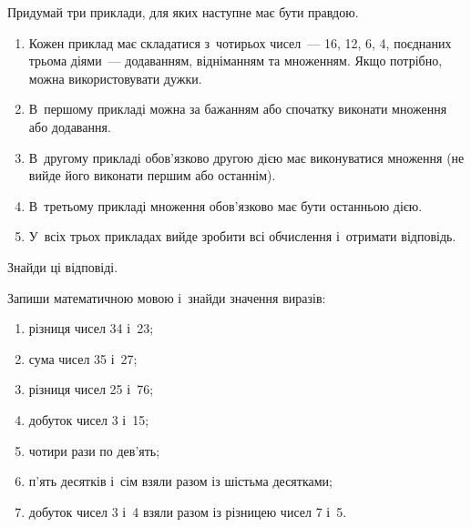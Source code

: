 \problem
Придумай три приклади, для яких наступне має бути правдою.
\begin{enumerate}
  \item Кожен приклад має складатися з~чотирьох чисел~--- 16, 12, 6, 4,
  поєднаних трьома діями~--- додаванням, відніманням та множенням.
  Якщо потрібно, можна використовувати дужки.
  \item В~першому прикладі можна за бажанням або
  спочатку виконати множення або додавання.
  \item В~другому прикладі обов'язково другою дією має
  виконуватися множення (не вийде його виконати першим або останнім).
  \item В~третьому прикладі множення обов'язково має бути останньою дією.
  \item У~всіх трьох прикладах вийде зробити всі обчислення і~отримати відповідь.
\end{enumerate}
Знайди ці відповіді.


\problem
Запиши математичною мовою і~знайди значення виразів:
\begin{enumerate}
  \item різниця чисел 34 і~23;
  \item сума чисел 35 і~27;
  \item різниця чисел 25 і~76;
  \item добуток чисел 3 і~15;
  \item чотири рази по дев'ять;
  \item п'ять десятків і~сім взяли разом із шістьма десятками;
  \item добуток чисел 3 і~4 взяли разом із різницею чисел 7 і~5.
\end{enumerate}


